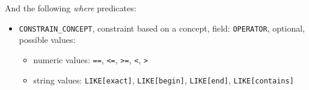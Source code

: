 And the following \emph{where} predicates:
\begin{itemize}
    \item \verb|CONSTRAIN_CONCEPT|, constraint based on a concept, field:
    \verb|OPERATOR|, optional, possible values:
    \begin{itemize}
        \item numeric values: \verb|==|, \verb|<=|, \verb|>=|, \verb|<|, \verb|>|
        \item string values: \verb|LIKE[exact]|, \verb|LIKE[begin]|, \verb|LIKE[end]|, \verb|LIKE[contains]|
    \end{itemize}
\end{itemize}



